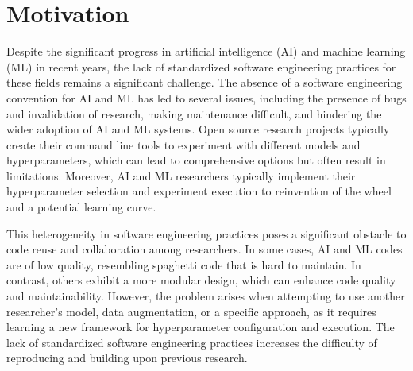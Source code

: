 
\section{Motivation}

Despite the significant progress in artificial intelligence (AI) and machine learning (ML) in recent years, the lack of standardized software engineering practices for these fields remains a significant challenge. The absence of a software engineering convention for AI and ML has led to several issues, including the presence of bugs and invalidation of research, making maintenance difficult, and hindering the wider adoption of AI and ML systems. Open source research projects typically create their command line tools to experiment with different models and hyperparameters, which can lead to comprehensive options but often result in limitations. Moreover, AI and ML researchers typically implement their hyperparameter selection and experiment execution to reinvention of the wheel and a potential learning curve.

This heterogeneity in software engineering practices poses a significant obstacle to code reuse and collaboration among researchers. In some cases, AI and ML codes are of low quality, resembling spaghetti code that is hard to maintain. In contrast, others exhibit a more modular design, which can enhance code quality and maintainability. However, the problem arises when attempting to use another researcher's model, data augmentation, or a specific approach, as it requires learning a new framework for hyperparameter configuration and execution. The lack of standardized software engineering practices increases the difficulty of reproducing and building upon previous research.



